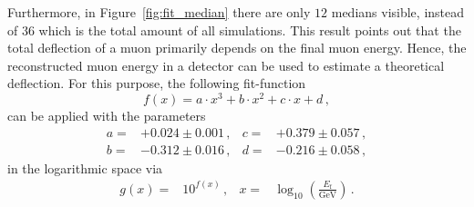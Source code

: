 Furthermore, in Figure~\ref{fig:fit_median} there are only $12$ medians visible, 
instead of $36$ which is the total amount of all simulations. This result points 
out that the total deflection of a muon 
primarily depends on the final muon energy. Hence, the reconstructed muon 
energy in a detector can be used to estimate a theoretical deflection. For this 
purpose, the following fit-function 
\begin{equation}
     f(x) = a \cdot x^3 + b \cdot x^2 + c \cdot x + d \,,
    \label{eqn:fit_median}
\end{equation}
can be applied with the parameters 
\begin{align}
    a =& +0.024 \pm 0.001\,,  & c =& +0.379 \pm 0.057\,,\\
    b =& -0.312 \pm 0.016\,,  & d =& -0.216 \pm 0.058\,,
\end{align}
in the logarithmic space via 
\begin{align}
    g(x) =& 10^{f(x)}\,, & x =& \log_{10}\left(\frac{E_{\text{f}}}{\si{\giga\electronvolt}}\right)\,.
\end{align}


